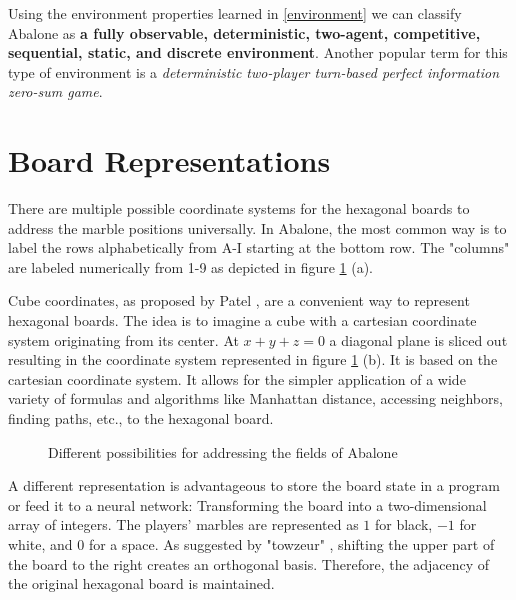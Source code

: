 Using the environment properties learned in \ref{environment} we can classify Abalone as \textbf{a fully observable, deterministic, two-agent, competitive, sequential, static, and discrete environment}. Another popular term for this type of environment is a \textit{deterministic two-player turn-based perfect information zero-sum game}.

\section{Board Representations}
\label{board_representations}

There are multiple possible coordinate systems for the hexagonal boards to address the marble positions universally. In Abalone, the most common way is to label the rows alphabetically from A-I starting at the bottom row. The "columns" are labeled numerically from 1-9 as depicted in figure \ref{abalone_coordinate_systems} (a).

Cube coordinates, as proposed by Patel \cite{noauthor_red_nodate}, are a convenient way to represent hexagonal boards. The idea is to imagine a cube with a cartesian coordinate system originating from its center. At $x + y + z = 0$ a diagonal plane is sliced out resulting in the coordinate system represented in figure \ref{abalone_coordinate_systems} (b). It is based on the cartesian coordinate system. It allows for the simpler application of a wide variety of formulas and algorithms like Manhattan distance, accessing neighbors, finding paths, etc., to the hexagonal board.

\begin{figure}[!h]
    \centering
    \caption{Different possibilities for addressing the fields of Abalone}
    \label{abalone_coordinate_systems}
\end{figure}

A different representation is advantageous to store the board state in a program or feed it to a neural network: Transforming the board into a two-dimensional array of integers. The players' marbles are represented as $1$ for black, $-1$ for white, and 0 for a space. As suggested by "towzeur" \cite{towzeur_towzeurgym-abalone_2021}, shifting the upper part of the board to the right creates an orthogonal basis. Therefore, the adjacency of the original hexagonal board is maintained.

